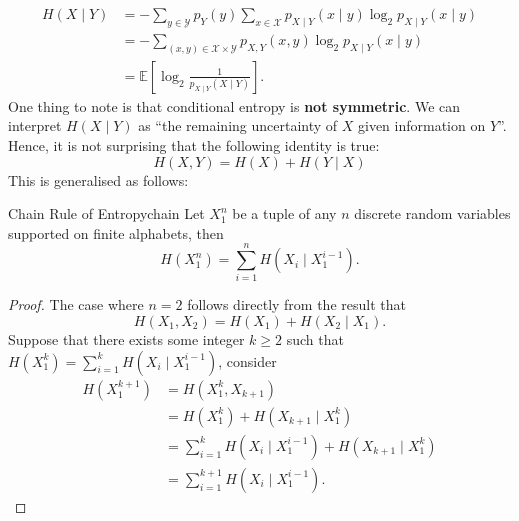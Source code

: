 \documentclass[math, code]{amznotes}
\theoremstyle{remark}
\begin{document}
\begin{align*}
    H\left(X \mid Y\right) & = -\sum_{y \in \mathcal{Y}}p_Y\left(y\right)\sum_{x \in \mathcal{X}}p_{X \mid Y}\left(x \mid y\right)\log_2p_{X \mid Y}\left(x \mid y\right) \\
    & = -\sum_{\left(x, y\right) \in \mathcal{X \times Y}}p_{X, Y}\left(x, y\right)\log_2p_{X \mid Y}\left(x \mid y\right) \\
    & = \mathbb{E}\left[\log_2\frac{1}{p_{X \mid Y}\left(X \mid Y\right)}\right].
\end{align*}
One thing to note is that conditional entropy is \textbf{not symmetric}. We can interpret $H\left(X \mid Y\right)$ as ``the remaining uncertainty of $X$ given information on $Y$''. Hence, it is not surprising that the following identity is true:
\begin{equation*}
    H\left(X, Y\right) = H\left(X\right) + H\left(Y \mid X\right)
\end{equation*}
This is generalised as follows:
\begin{probox}{Chain Rule of Entropy}{chain}
    Let $X_1^n$ be a tuple of any $n$ discrete random variables supported on finite alphabets, then 
    \begin{equation*}
        H\left(X_1^n\right) = \sum_{i = 1}^{n}H\left(X_i \mid X_1^{i - 1}\right).
    \end{equation*}
    \tcblower
    \begin{proof}
        The case where $n = 2$ follows directly from the result that 
        \begin{equation*}
            H\left(X_1, X_2\right) = H\left(X_1\right) + H\left(X_2 \mid X_1\right).
        \end{equation*}
        Suppose that there exists some integer $k \geq 2$ such that $H\left(X_1^k\right) = \sum_{i = 1}^{k}H\left(X_i \mid X_1^{i - 1}\right)$, consider
        \begin{align*}
            H\left(X_1^{k + 1}\right) & = H\left(X_1^k, X_{k + 1}\right) \\
            & = H\left(X_1^k\right) + H\left(X_{k + 1} \mid X_1^k\right) \\
            & = \sum_{i = 1}^{k}H\left(X_i \mid X_1^{i - 1}\right) + H\left(X_{k + 1} \mid X_1^k\right) \\
            & = \sum_{i = 1}^{k + 1}H\left(X_i \mid X_1^{i - 1}\right).
        \end{align*}
    \end{proof}
\end{probox}
\end{document}
